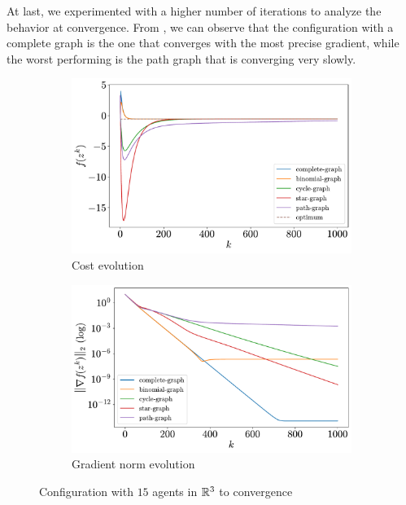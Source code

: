 \documentclass[a4paper,11pt,oneside]{book}
\begin{document}
At last, we experimented with a higher number of iterations to analyze the behavior at convergence. From , we can observe that the configuration with a complete graph is the one that converges with the most precise gradient, while the worst performing is the path graph that is converging very slowly.

\begin{figure}[ht]
      \centering
      \begin{subfigure}[t]{0.49\textwidth}
            \centering
            \includegraphics[width=\linewidth]{./figs/quadratic/cost_15_3_1000.pdf} 
            \caption{Cost evolution}
      \end{subfigure}
      \hfill
      \begin{subfigure}[t]{0.49\textwidth}
            \centering
            \includegraphics[width=\linewidth]{./figs/quadratic/gradient_15_3_1000.pdf} 
            \caption{Gradient norm evolution}
      \end{subfigure}
      \caption{Configuration with $15$ agents in ${\mathbb{R}}^{3}$ to convergence}
      \label{fig:quadratic_15_3_1000}
\end{figure}
\end{document}

